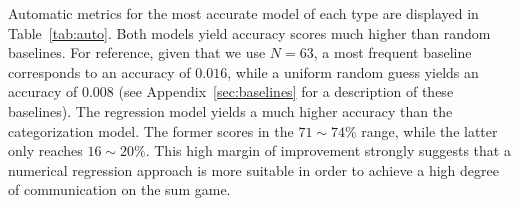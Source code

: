 \documentclass[twocolumn]{article}
\begin{document}
\begin{table}%
    \centering

    \caption{\label{tab:auto} Performances of best models}
\end{table}

Automatic metrics for the most accurate model of each type are displayed in Table~\ref{tab:auto}.
Both models yield accuracy scores much higher than random baselines.
For reference, given that we use $N=63$, a most frequent baseline corresponds to an accuracy of $0.016$, while a uniform random guess yields an accuracy of $0.008$ (see Appendix~\ref{sec:baselines} for a description of these baselines).
The regression model yields a much higher accuracy than the categorization model.
The former scores in the $71\sim74\%$ range, while the latter only reaches $16\sim20\%$.
This high margin of improvement strongly suggests that a numerical regression approach is more suitable in order to achieve a high degree of communication on the sum game.
\end{document}
